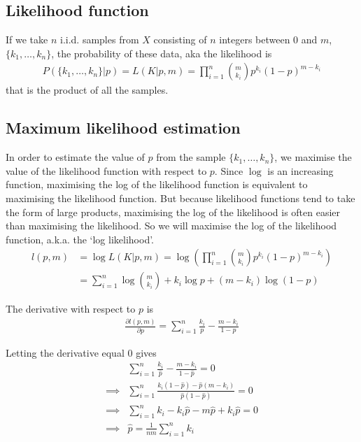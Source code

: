 \documentclass[a4paper,12pt]{article}
\theoremstyle{definition}
\newcommand{\pdiff}[2]{\frac{\partial #1}{\partial #2}} %
\begin{document}
\subsection{Likelihood function}
If we take $n$ i.i.d. samples from $X$ consisting of $n$ integers between $0$ and $m$, $\lbrace k_1, \dots , k_n \rbrace$, the probability of these data, aka the likelihood is
\begin{align}
  P(\lbrace k_1, \dots , k_n \rbrace | p) = L(K|p, m) = \prod_{i=1}^n \binom{m}{k_i} p^{k_i}(1-p)^{m-k_i}
\end{align}
that is the product of all the samples.

\subsection{Maximum likelihood estimation}
In order to estimate the value of $p$ from the sample $\lbrace k_1, \dots , k_n \rbrace$, we maximise the value of the likelihood function with respect to $p$. Since $\log$ is an increasing function, maximising the log of the likelihood function is equivalent to maximising the likelihood function. But because likelihood functions tend to take the form of large products, maximising the log of the likelihood is often easier than maximising the likelihood. So we will maximise the log of the likelihood function, a.k.a. the `log likelihood'.
\begin{align}
  l(p, m)  &= \log L(K|p, m) = \log \left( \prod_{i=1}^n \binom{m}{k_i} p^{k_i}(1-p)^{m-k_i} \right) \\
        &= \sum_{i=1}^n \log \binom{m}{k_i} +  k_i \log p + (m - k_i) \log (1-p) 
\end{align}

The derivative with respect to $p$ is
\begin{align}
  \pdiff{l(p, m)}{p} = \sum_{i=1}^n \frac{k_i}{p} - \frac{m - k_i}{1-p}
\end{align}

Letting the derivative equal $0$ gives
\begin{align}
  & \sum_{i=1}^n \frac{k_i}{\hat{p}} - \frac{m - k_i}{1-\hat{p}} = 0 \\
  \implies & \sum_{i=1}^n \frac{k_i (1-\hat{p}) - \hat{p}(m - k_i)}{\hat{p}(1-\hat{p})} = 0 \\
  \implies & \sum_{i=1}^n k_i - k_i \hat{p} - m \hat{p} + k_i \hat{p} = 0 \\
  \implies & \hat{p} = \frac{1}{nm} \sum_{i=1}^n k_i
\end{align}
\end{document}

